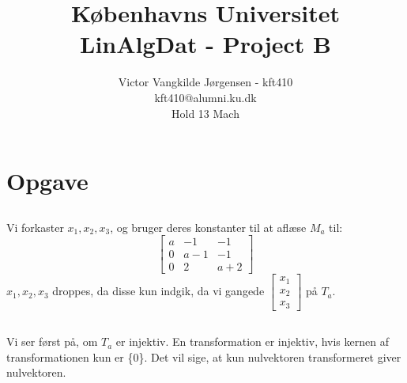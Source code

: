 \documentclass[a4paper,12pt]{article}
\title{Københavns Universitet\\
LinAlgDat - Project B}
\author{Victor Vangkilde Jørgensen - kft410\\ 
kft410@alumni.ku.dk\\
Hold 13 Mach}
\begin{document}
 
 
\maketitle 

\section[Opgave]{Opgave}
\subsection{}

Vi forkaster $x_1, x_2, x_3$, og bruger deres konstanter til at aflæse $M_a$ til:\\
\[
\left[\begin{array}{ccc}
    a & -1 & -1 \\
    0 & a-1 & -1 \\
    0 & 2 & a+2
\end{array}\right]
\]
$x_1, x_2, x_3$ droppes, da disse kun indgik, da vi gangede $\left[\begin{array}{ccc|c}    x_1 \\
    x_2 \\
    x_3
\end{array}\right]$ på $T_a$.




\subsection{}
Vi ser først på, om $T_a$ er injektiv. En transformation er injektiv, hvis kernen af transformationen kun er \{0\}. Det vil sige, at kun nulvektoren transformeret giver nulvektoren.\\
\end{document}
